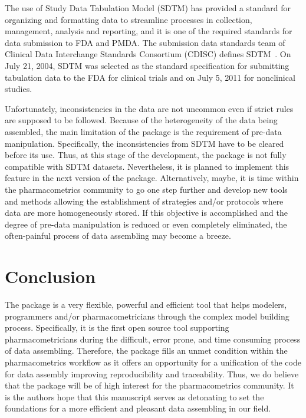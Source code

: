 The use of Study Data Tabulation Model (SDTM) has provided a standard for organizing and formatting data to streamline processes in collection, management, analysis and reporting, and it is one of the required standards for data submission to FDA and PMDA. The submission data standards team of Clinical Data Interchange Standards Consortium (CDISC) defines SDTM~\citep{DISC}.  On July 21, 2004, SDTM was selected as the standard specification for submitting tabulation data to the FDA for clinical trials and on July 5, 2011 for nonclinical studies. 

Unfortunately, inconsistencies in the data are not uncommon even if strict rules are supposed to be followed. Because of the heterogeneity of the data being assembled, the main limitation of the  package is the requirement of pre-data manipulation. Specifically, the inconsistencies from SDTM have to be cleared before its use. Thus, at this stage of the development, the  package is not fully compatible with SDTM datasets. Nevertheless, it is planned to implement this feature in the next version of the package. Alternatively, maybe, it is time within the pharmacometrics community to go one step further and develop new tools and methods allowing the establishment of strategies and/or protocols where data are more homogeneously stored. If this objective is accomplished and the degree of pre-data manipulation is reduced or even completely eliminated, the often-painful process of data assembling may become a breeze. 

\section{Conclusion}
The  package is a very flexible, powerful and efficient tool that helps modelers, programmers and/or pharmacometricians through the complex model building process. Specifically, it is the first open source tool supporting pharmacometricians during the difficult, error prone, and time consuming process of data assembling. Therefore, the  package fills an unmet condition within the pharmacometrics workflow as it offers an opportunity for a unification of the code for data assembly improving reproducibility and traceability. Thus, we do believe that the  package will be of high interest for the pharmacometrics community. It is the authors hope that this manuscript serves as detonating to set the foundations for a more efficient and pleasant data assembling in our field.

